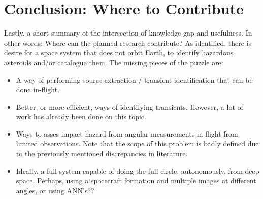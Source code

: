 \documentclass[a4paper,10pt]{article}
\begin{document}
\section{Conclusion: Where to Contribute}
Lastly, a short summary of the intersection of knowledge gap and usefulness. In other words: Where can the planned research contribute? As identified, there is desire for a space system that does not orbit Earth, to identify hazardous asteroids and/or catalogue them. The missing pieces of the puzzle are:
\begin{itemize}
 \item A way of performing source extraction / transient identification that can be done in-flight. 
 \item Better, or more efficient, ways of identifying transients. However, a lot of work has already been done on this topic.
 \item Ways to asses impact hazard from angular measurements in-flight from limited observations. Note that the scope of this problem is badly defined due to the previously mentioned discrepancies in literature.
 \item Ideally, a full system capable of doing the full circle, autonomously, from deep space. Perhaps, using a spacecraft formation and multiple images at different angles, or using ANN's??
\end{itemize}
\end{document}
